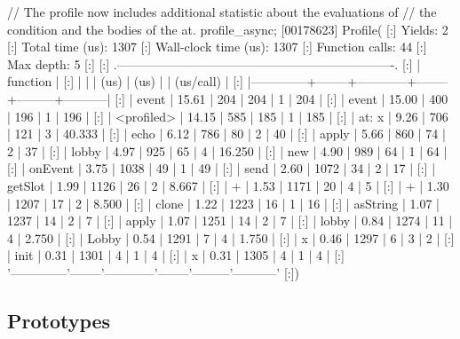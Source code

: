 \begin{urbiscript}
// The profile now includes additional statistic about the evaluations of
// the condition and the bodies of the at.
profile_async;
[00178623] Profile(
[:]  Yields:                    2
[:]  Total time (us):        1307
[:]  Wall-clock time (us):   1307
[:]  Function calls:           44
[:]  Max depth:                 5
[:]
[:]  .-------------------------------------------------------------------.
[:]  |   function   |   %
[:]  |              |        |    (us)    |  (us)  |         | (us/call) |
[:]  |--------------+--------+------------+--------+---------+-----------|
[:]  |        event |  15.61 |        204 |    204 |       1 |       204 |
[:]  |        event |  15.00 |        400 |    196 |       1 |       196 |
[:]  |   <profiled> |  14.15 |        585 |    185 |       1 |       185 |
[:]  |    at: { x } |   9.26 |        706 |    121 |       3 |    40.333 |
[:]  |         echo |   6.12 |        786 |     80 |       2 |        40 |
[:]  |        apply |   5.66 |        860 |     74 |       2 |        37 |
[:]  |        lobby |   4.97 |        925 |     65 |       4 |    16.250 |
[:]  |          new |   4.90 |        989 |     64 |       1 |        64 |
[:]  |      onEvent |   3.75 |       1038 |     49 |       1 |        49 |
[:]  |         send |   2.60 |       1072 |     34 |       2 |        17 |
[:]  |      getSlot |   1.99 |       1126 |     26 |       2 |     8.667 |
[:]  |            + |   1.53 |       1171 |     20 |       4 |         5 |
[:]  |            + |   1.30 |       1207 |     17 |       2 |     8.500 |
[:]  |        clone |   1.22 |       1223 |     16 |       1 |        16 |
[:]  |     asString |   1.07 |       1237 |     14 |       2 |         7 |
[:]  |        apply |   1.07 |       1251 |     14 |       2 |         7 |
[:]  |        lobby |   0.84 |       1274 |     11 |       4 |     2.750 |
[:]  |        Lobby |   0.54 |       1291 |      7 |       4 |     1.750 |
[:]  |            x |   0.46 |       1297 |      6 |       3 |         2 |
[:]  |         init |   0.31 |       1301 |      4 |       1 |         4 |
[:]  |            x |   0.31 |       1305 |      4 |       1 |         4 |
[:]  '--------------'--------'------------'--------'---------'-----------'
[:])
\end{urbiscript}

\subsection{Prototypes}

